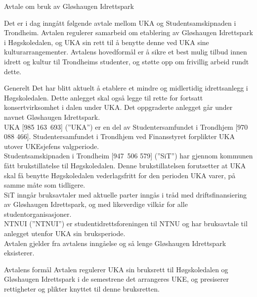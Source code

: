 \begin{instruks}{Avtale om bruk av Gløshaugen Idrettspark} 



Det er i dag inngått følgende avtale mellom UKA og Studentsamskipnaden i Trondheim. Avtalen regulerer samarbeid om etablering av Gløshaugen Idrettspark i Høgskoledalen, og UKA sin rett til å benytte denne ved UKA sine kulturarrangementer. Avtalens hovedformål er å sikre et best mulig tilbud innen idrett og kultur til Trondheims studenter, og støtte opp om frivillig arbeid rundt dette.


\begin{instruksledd}{Generelt} 
Det har blitt aktuelt å etablere et mindre og midlertidig idrettsanlegg i Høgskoledalen. Dette anlegget skal også legge til rette for fortsatt konsertvirksomhet i dalen under UKA.  Det oppgraderte anlegget går under navnet Gløshaugen Idrettspark.\\ 

UKA [985 163 693] (”UKA”) er en del av Studentersamfundet i Trondhjem [970 088 466]. Studentersamfundet i Trondhjem ved Finansstyret forplikter UKA utover UKEsjefens valgperiode.\\

Studentsamskipnaden i Trondheim [947 506 579] (”SiT”) har gjennom kommunen fått brukstillatelse til Høgskoledalen. Denne brukstillatelsen forutsetter at UKA skal få benytte Høgskoledalen vederlagsfritt for den perioden UKA varer, på samme måte som tidligere.\\  

SiT inngår bruksavtaler med aktuelle parter inngås i tråd med driftsfinansiering av Gløshaugen Idrettspark, og med likeverdige vilkår for alle studentorganisasjoner.\\

NTNUI (”NTNUI”) er studentidrettsforeningen til NTNU og har bruksavtale til anlegget utenfor UKA sin bruksperiode.\\

Avtalen gjelder fra avtalens inngåelse og så lenge Gløshaugen Idrettspark eksisterer.\\
\end{instruksledd}
 
\begin{instruksledd}{Avtalens formål}
Avtalen regulerer UKA sin bruksrett til Høgskoledalen og Gløshaugen Idrettspark i de semestrene det arrangeres UKE, og presiserer rettigheter og plikter knyttet til denne bruksretten.\\
 

\end{instruksledd}
\end{instruks}
